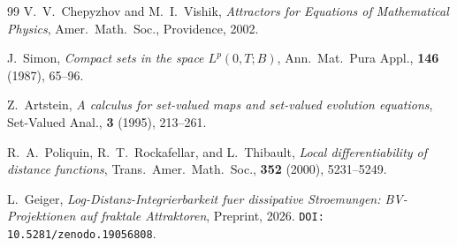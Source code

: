 \documentclass[12pt,a4paper]{article}
\theoremstyle{definition}
\theoremstyle{plain}
\theoremstyle{remark}
\begin{document}
\begin{thebibliography}{99}
V.~V.~Chepyzhov and M.~I.~Vishik, \textit{Attractors for Equations of Mathematical Physics}, Amer.\ Math.\ Soc., Providence, 2002.

J.~Simon, \textit{Compact sets in the space $L^p(0,T;B)$}, Ann.\ Mat.\ Pura Appl., \textbf{146} (1987), 65--96.

Z.~Artstein, \textit{A calculus for set-valued maps and set-valued evolution equations}, Set-Valued Anal., \textbf{3} (1995), 213--261.

R.~A.~Poliquin, R.~T.~Rockafellar, and L.~Thibault, \textit{Local differentiability of distance functions}, Trans.\ Amer.\ Math.\ Soc., \textbf{352} (2000), 5231--5249.

 L.~Geiger, \textit{Log-Distanz-Integrierbarkeit fuer dissipative Stroemungen: BV-Projektionen auf fraktale Attraktoren}, Preprint, 2026. \texttt{DOI: 10.5281/zenodo.19056808}.

\end{thebibliography}
\end{document}
